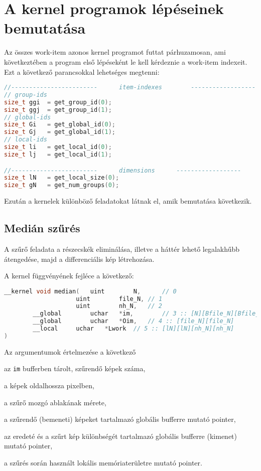 \chapter{A kernel programok lépéseinek bemutatása}
Az összes work-item azonos kernel programot futtat párhuzamosan, ami következtében a program első lépéseként le kell kérdeznie a
work-item indexeit. Ezt a következő parancsokkal lehetséges megtenni:
\begin{lstlisting}[language=C++]
//------------------------		item-indexes		------------------
// group-ids
size_t ggi	= get_group_id(0);
size_t ggj	= get_group_id(1);
// global-ids
size_t Gi	= get_global_id(0);
size_t Gj	= get_global_id(1);
// local-ids
size_t li	= get_local_id(0);
size_t lj	= get_local_id(1);

//------------------------		dimensions		------------------
size_t lN	= get_local_size(0);
size_t gN	= get_num_groups(0);
\end{lstlisting}

\noindent Ezután a kernelek különböző feladatokat látnak el, amik bemutatása következik. 
\section{Medián szűrés}
	A szűrő feladata a részecskék eliminálása, illetve a háttér lehető legalakhűbb átengedése, majd a differenciális kép létrehozása.
	
\noindent A kernel függvényének fejléce a következő:
\begin{lstlisting}[language=C++]
__kernel void median(	uint		N,		// 0
					uint		file_N,	// 1
					uint		nh_N,	// 2
		__global		uchar	*im,		// 3 :: [N][Bfile_N][Bfile_N]					
		__global		uchar	*Oim,	// 4 :: [file_N][file_N]
		__local		uchar	*Lwork	// 5 :: [lN][lN][nh_N][nh_N]
)
\end{lstlisting}

\noindent Az argumentumok értelmezése a következő
	\begin{description}[noitemsep]
		\item[\texttt{N}] az \texttt{im} bufferben tárolt, szűrendő képek száma,
		\item[\texttt{file\_N}] a képek oldalhossza pixelben,
		\item[\texttt{nh\_N}] a szűrő mozgó ablakának mérete,
		\item[\texttt{im}] a szűrendő (bemeneti) képeket tartalmazó globális bufferre mutató pointer,
		\item[\texttt{Oim}] az eredeté és a szűrt kép különbségét tartalmazó globális bufferre (kimenet) mutató pointer,
		\item[\texttt{Lwork}] a szűrés során használt lokális memóriaterületre mutató pointer.
	\end{description}
	
